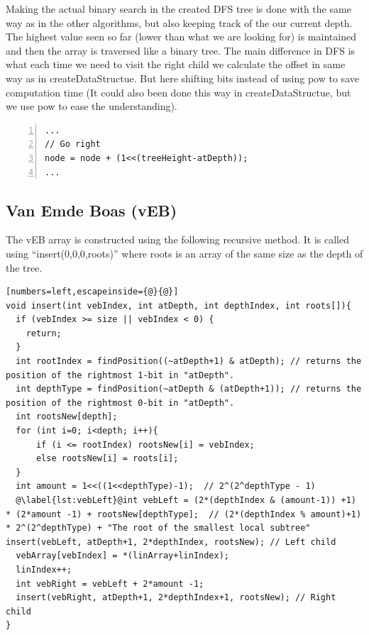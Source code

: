 Making the actual binary search in the created DFS tree is done with the same way as in the other algorithms, but also keeping track of the our current depth.
The highest value seen so far (lower than what we are looking for) is maintained and then the array is traversed like a binary tree. 
The main difference in DFS is what each time we need to visit the right child we calculate the offset in same way as in createDataStructue.  
But here shifting bits instead of using pow to save computation time (It could also been done this way in createDataStructue, but we use pow to ease the understanding). 
\begin{lstlisting}[numbers=left]
 ...
// Go right
node = node + (1<<(treeHeight-atDepth));
...
\end{lstlisting}



\subsection{Van Emde Boas (vEB)}

The vEB array is constructed using the following recursive method. It is called using ``insert(0,0,0,roots)'' where roots is an array of the same size as the depth of the tree.

\begin{lstlisting}[numbers=left,escapeinside={@}{@}]
void insert(int vebIndex, int atDepth, int depthIndex, int roots[]){
  if (vebIndex >= size || vebIndex < 0) {
    return;
  }
  int rootIndex = findPosition((~atDepth+1) & atDepth); // returns the position of the rightmost 1-bit in "atDepth".
  int depthType = findPosition(~atDepth & (atDepth+1)); // returns the position of the rightmost 0-bit in "atDepth".
  int rootsNew[depth];
  for (int i=0; i<depth; i++){
      if (i <= rootIndex) rootsNew[i] = vebIndex;
      else rootsNew[i] = roots[i];
  }
  int amount = 1<<((1<<depthType)-1);  // 2^(2^depthType - 1)
  @\label{lst:vebLeft}@int vebLeft = (2*(depthIndex & (amount-1)) +1) * (2*amount -1) + rootsNew[depthType];  // (2*(depthIndex % amount)+1) * 2^(2^depthType) + "The root of the smallest local subtree"  insert(vebLeft, atDepth+1, 2*depthIndex, rootsNew); // Left child
  vebArray[vebIndex] = *(linArray+linIndex);
  linIndex++;
  int vebRight = vebLeft + 2*amount -1;
  insert(vebRight, atDepth+1, 2*depthIndex+1, rootsNew); // Right child
}
\end{lstlisting}

